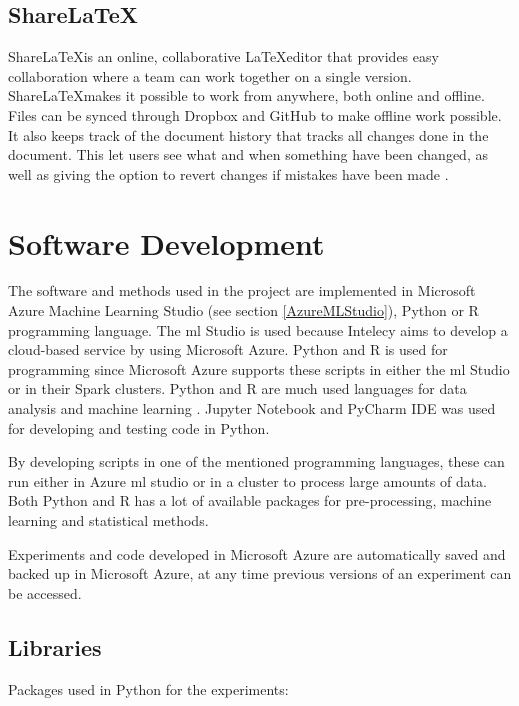 \documentclass[english, a4paper]{report}
\begin{document}
{{        \subsection{Share\LaTeX}
        {
            Share\LaTeX is an online, collaborative \LaTeX editor that provides easy collaboration where a team can work together on a single version. Share\LaTeX makes it possible to work from anywhere, both online and offline. Files can be synced through Dropbox and GitHub to make offline work possible. It also keeps track of the document history that tracks all changes done in the document. This let users see what and when something have been changed, as well as giving the option to revert changes if mistakes have been made \cite{sharelatex}. 
        }
    }
    
    \section{Software Development}
    {
        The software and methods used in the project are implemented in Microsoft Azure Machine Learning Studio (see section \ref{AzureMLStudio}), Python or R programming language. The \gls{ml} Studio is used because Intelecy aims to develop a cloud-based service by using Microsoft Azure. Python and R is used for programming since Microsoft Azure supports these scripts in either the \gls{ml} Studio or in their Spark clusters. Python and R are much used languages for data analysis and machine learning \cite{progammingLanguageForML}. Jupyter Notebook and PyCharm IDE was used for developing and testing code in Python.
        \par 
        By developing scripts in one of the mentioned programming languages, these can run either in Azure \gls{ml} studio or in a cluster to process large amounts of data. Both Python and R has a lot of available packages for pre-processing, machine learning and statistical methods. 
        \par
        Experiments and code developed in Microsoft Azure are automatically saved and backed up in Microsoft Azure, at any time previous versions of an experiment can be accessed.

        \subsection{Libraries}\label{Libraries}
        {
            Packages used in Python for the experiments:
            
}}}
\end{document}
